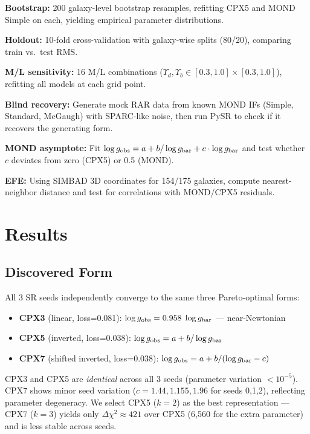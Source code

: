 \documentclass[twocolumn]{aastex631}
\begin{document}
\textbf{Bootstrap:} 200 galaxy-level bootstrap resamples, refitting CPX5
and MOND Simple on each, yielding empirical parameter distributions.

\textbf{Holdout:} 10-fold cross-validation with galaxy-wise splits (80/20),
comparing train vs.\ test RMS.

\textbf{M/L sensitivity:} 16 M/L combinations ($\Upsilon_d,\Upsilon_b \in
[0.3,1.0] \times [0.3,1.0]$), refitting all models at each grid point.

\textbf{Blind recovery:} Generate mock RAR data from known MOND IFs (Simple,
Standard, McGaugh) with SPARC-like noise, then run PySR to check if it
recovers the generating form.

\textbf{MOND asymptote:} Fit $\log g_{\rm obs} = a + b/\log g_{\rm bar} +
c\cdot\log g_{\rm bar}$ and test whether $c$ deviates from zero (CPX5) or
0.5 (MOND).

\textbf{EFE:} Using SIMBAD 3D coordinates for 154/175 galaxies, compute
nearest-neighbor distance and test for correlations with MOND/CPX5 residuals.

\section{Results}

\subsection{Discovered Form}

All 3 SR seeds independently converge to the same three Pareto-optimal forms:
\begin{itemize}
\item \textbf{CPX3} (linear, loss=0.081): $\log g_{\rm obs} = 0.958\;\log g_{\rm bar}$ --- near-Newtonian
\item \textbf{CPX5} (inverted, loss=0.038): $\log g_{\rm obs} = a + b/\log g_{\rm bar}$
\item \textbf{CPX7} (shifted inverted, loss=0.038): $\log g_{\rm obs} = a + b/(\log g_{\rm bar} - c)$
\end{itemize}

CPX3 and CPX5 are \emph{identical} across all 3 seeds (parameter variation
$<10^{-5}$).  CPX7 shows minor seed variation ($c = 1.44, 1.155, 1.96$ for
seeds 0,1,2), reflecting parameter degeneracy.  We select CPX5 ($k=2$) as
the best representation --- CPX7 ($k=3$) yields only $\Delta\chi^2 \approx
421$ over CPX5 (6,560 for the extra parameter) and is less stable across
seeds.
\end{document}
